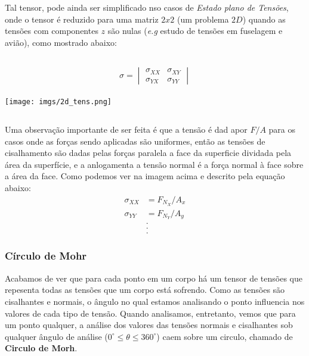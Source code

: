 \documentclass{article}
\begin{document}
Tal tensor, pode ainda ser simplificado nso casos de \emph{Estado plano de Tensões}, onde o tensor é reduzido para uma matriz $2x2$ (um problema $2D$) quando as tensões com componentes $z$ são nulas (\emph{e.g} estudo de tensões em fuselagem e avião), como mostrado abaixo:

$$$$
\begin{minipage}{.5\textwidth}
    \begin{align*}
        \sigma = \begin{vmatrix}
                     \sigma_{XX} & \sigma_{XY} \\
                     \sigma_{YX} & \sigma_{YY}
                 \end{vmatrix}
    \end{align*}
\end{minipage}
\begin{minipage}{.5\textwidth}
    \texttt{[image: imgs/2d\_tens.png]}
\end{minipage}
$$$$

Uma observação importante de ser feita é que a tensão é dad apor $F/A$ para os casos onde as forças sendo aplicadas são uniformes, então as tensões de cisalhamento são dadas pelas forças paralela a face da superficie dividada pela área da superfície, e a anlogamenta a tensão normal é a força normal à face sobre a área da face. Como podemos ver na imagem acima e descrito pela equação abaixo:
\begin{align*}
    \sigma_{XX} & = F_{N_X} / A_x \\
    \sigma_{YY} & = F_{N_Y} / A_y \\
                & .               \\ &. \\ &.
\end{align*}

\newpage
\subsubsection*{Círculo de Mohr}
Acabamos de ver que para cada ponto em um corpo há um tensor de tensões que repesenta todas as tensões que um corpo está sofrendo. Como as tensões são cisalhantes e normais, o ângulo no qual estamos analisando o ponto influencia nos valores de cada tipo de tensão. Quando analisamos, entretanto, vemos que para um ponto qualquer, a análise dos valores das tensões normais e cisalhantes sob qualquer ângulo de análise ($0^\circ \le \theta \le 360^\circ $) caem sobre um circulo, chamado de \textbf{Circulo de Morh}.
\end{document}
